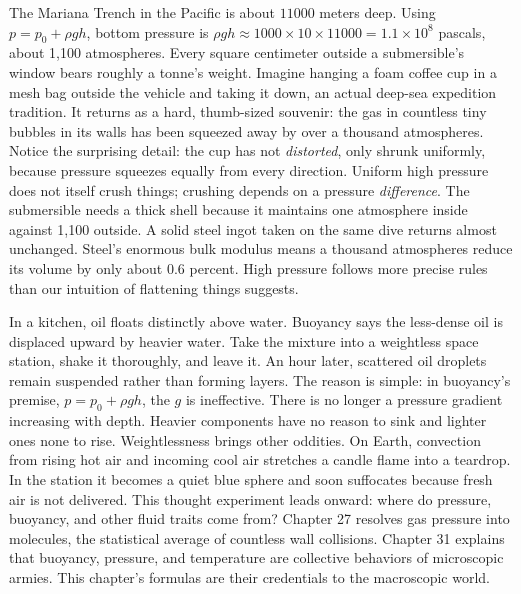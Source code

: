 
\begin{thought}
The Mariana Trench in the Pacific is about \(11000\) meters deep. Using \(p=p_{0}+\rho g h\), bottom pressure is \(\rho g h\approx1000\times10\times11000=1.1\times10^{8}\) pascals, about 1,100 atmospheres. Every square centimeter outside a submersible's window bears roughly a tonne's weight. Imagine hanging a foam coffee cup in a mesh bag outside the vehicle and taking it down, an actual deep-sea expedition tradition. It returns as a hard, thumb-sized souvenir: the gas in countless tiny bubbles in its walls has been squeezed away by over a thousand atmospheres. Notice the surprising detail: the cup has not \emph{distorted}, only shrunk uniformly, because pressure squeezes equally from every direction. Uniform high pressure does not itself crush things; crushing depends on a pressure \emph{difference}. The submersible needs a thick shell because it maintains one atmosphere inside against 1,100 outside. A solid steel ingot taken on the same dive returns almost unchanged. Steel's enormous bulk modulus means a thousand atmospheres reduce its volume by only about 0.6 percent. High pressure follows more precise rules than our intuition of flattening things suggests.
\end{thought}

\begin{thought}
In a kitchen, oil floats distinctly above water. Buoyancy says the less-dense oil is displaced upward by heavier water. Take the mixture into a weightless space station, shake it thoroughly, and leave it. An hour later, scattered oil droplets remain suspended rather than forming layers. The reason is simple: in buoyancy's premise, \(p=p_{0}+\rho g h\), the \(g\) is ineffective. There is no longer a pressure gradient increasing with depth. Heavier components have no reason to sink and lighter ones none to rise. Weightlessness brings other oddities. On Earth, convection from rising hot air and incoming cool air stretches a candle flame into a teardrop. In the station it becomes a quiet blue sphere and soon suffocates because fresh air is not delivered. This thought experiment leads onward: where do pressure, buoyancy, and other fluid traits come from? Chapter 27 resolves gas pressure into molecules, the statistical average of countless wall collisions. Chapter 31 explains that buoyancy, pressure, and temperature are collective behaviors of microscopic armies. This chapter's formulas are their credentials to the macroscopic world.
\end{thought}

